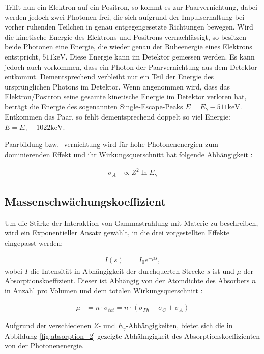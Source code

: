 \documentclass[
	parskip=half,10pt,
	numbers= noenddot, %
	toc=flat, %
	oneside,
	twocolumn,
	]{scrartcl}
\begin{document}
Trifft nun ein Elektron auf ein Positron, so kommt es zur Paarvernichtung, dabei werden jedoch zwei Photonen frei, die sich aufgrund der Impulserhaltung bei vorher 
ruhenden Teilchen in genau entgegengesetzte Richtungen bewegen. 
Wird die kinetische Energie des Elektrons und Positrons vernachlässigt, so besitzen beide Photonen eine Energie, 
die wieder genau der Ruheenergie eines Elektrons entstpricht, $511 \si{\kilo \electronvolt}$. Diese Energie kann im Detektor gemessen werden. Es kann jedoch auch 
vorkommen, dass ein Photon der Paarvernichtung aus dem Detektor entkommt. Dementsprechend verbleibt nur ein Teil der Energie des ursprünglichen 
Photons im Detektor. Wenn angenommen wird, dass das Elektron/Positron seine gesamte kinetische Energie im Detektor verloren hat, beträgt die Energie des 
sogenannten Single-Escape-Peaks $E = E_{\gamma} - 511 \si{\kilo \electronvolt}$. Entkommen das Paar, so fehlt dementsprechend doppelt so viel Energie: 
$E = E_{\gamma} - 1022 \si{\kilo \electronvolt}$. 

Paarbildung bzw. -vernichtung wird für hohe Photonenenergien zum dominierenden Effekt und ihr Wirkungsquerschnitt hat folgende Abhängigkeit \cite{harvey}:

\begin{align}
\sigma_A &\propto Z^2 \ln E_{\gamma}
\end{align}  


\subsection{Massenschwächungskoeffizient}

Um die Stärke der Interaktion von Gammastrahlung mit Materie zu beschreiben, wird ein Exponentieller Ansatz gewählt, in die drei vorgestellten Effekte eingepasst 
werden:

\begin{align}
I(s) &= I_0 e^{- \mu s},
\label{eq:abs}
\end{align}
wobei $I$ die Intensität in Abhängigkeit der durchquerten Strecke $s$ ist und $\mu$ der Absorptionskoeffizient. Dieser ist Abhängig von der Atomdichte des Absorbers $n$ 
in Anzahl pro Volumen und dem totalen Wirkungsquerschnitt \cite{marmier}:

\begin{align}
\mu &= n \cdot \sigma_{tot} = n \cdot ( \sigma_{Ph} + \sigma_C + \sigma_A)
\label{eq:sigma}
\end{align}

Aufgrund der verschiedenen $Z$- und $E_{\gamma}$-Abhängigkeiten, bietet sich die in Abbildung \ref{fig:absorption_2} gezeigte Abhähngigkeit des Absorptionskoeffizienten 
von der Photonenenergie.
\end{document}
